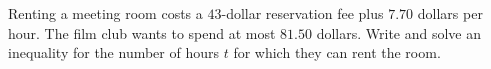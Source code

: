 Renting a meeting room costs a $43$-dollar reservation fee plus $7.70$ dollars per hour. The film club wants to spend at most $81.50$ dollars. Write and solve an inequality for the number of hours $t$ for which they can rent the room.
